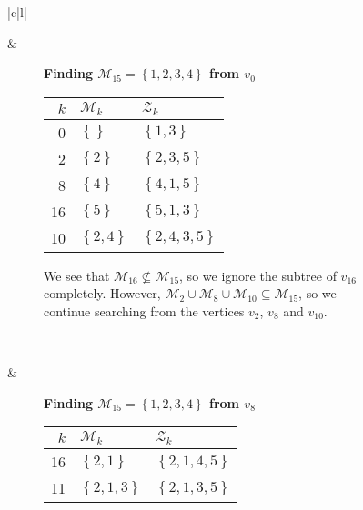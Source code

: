 
\begin{figure}[ht!]
    \centering
    \begin{tabular}[t]{|c|l|}\hline
    \begin{subfigure}[b]{0.35\textwidth}
        \centering
        
    \end{subfigure}
    & 
    \begin{subfigure}[b]{0.64\textwidth}
        \textbf{Finding $\mathcal{M}_{15} = \left\{{1,2,3,4}\right\}$ from $v_0$} \\
        \begin{tabular}{rll}
            $k$ & $\mathcal{M}_k$            & $\mathcal{Z}_k$ \\ \hline
            0   & $\left\{{}\right\}$        & $\left\{{1,3}\right\}$ \\ 
            2   & $\left\{{2}\right\}$       & $\left\{{2,3,5}\right\}$ \\ 
            8   & $\left\{{4}\right\}$       & $\left\{{4,1,5}\right\}$ \\ 
            16  & $\left\{{5}\right\}$       & $\left\{{5,1,3}\right\}$ \\ 
            10  & $\left\{{2,4}\right\}$     & $\left\{{2,4,3,5}\right\}$ \\ 
        \end{tabular}

        We see that $\mathcal{M}_{16} \not \subseteq \mathcal{M}_{15}$, so we
        ignore the subtree of $v_{16}$ completely. However, $\mathcal{M}_2 \cup
        \mathcal{M}_8 \cup \mathcal{M}_{10} \subseteq \mathcal{M}_{15}$, so we
        continue searching from the vertices $v_2$, $v_8$ and $v_{10}$.
    \end{subfigure}
    \\ \hline
    \begin{subfigure}[b]{0.35\textwidth}
        \centering
        
    \end{subfigure}
    & 
    \begin{subfigure}[b]{0.64\textwidth}
        \textbf{Finding $\mathcal{M}_{15} = \left\{{1,2,3,4}\right\}$ from $v_8$} \\
        \begin{tabular}{rll}
            $k$ & $\mathcal{M}_k$            & $\mathcal{Z}_k$ \\ \hline
            16       & $\left\{{2,1}\right\}$     & $\left\{{2,1,4,5}\right\}$ \\ 
            11       & $\left\{{2,1,3}\right\}$   & $\left\{{2,1,3,5}\right\}$ \\ 
        \end{tabular}


\end{subfigure}
\end{tabular}
\end{figure}
